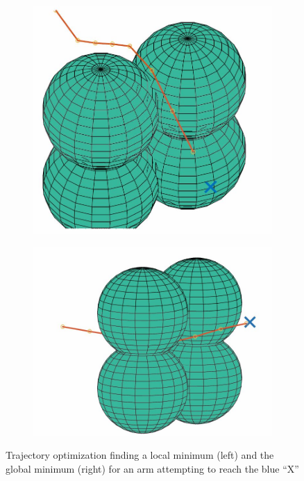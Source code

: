 \documentclass[../thesis.tex]{subfiles}
\begin{document}
\begin{figure}
  \centering
  \begin{subfigure}[b]{0.4\linewidth}
    \includegraphics[width=\linewidth]{./Planning/Local.jpg}    
  \end{subfigure}
  \begin{subfigure}[b]{0.4\linewidth}
    \includegraphics[width=\linewidth]{./Planning/global.jpg}    
  \end{subfigure}
  \caption{Trajectory optimization finding a local minimum (left) and the global minimum (right) for an arm attempting to reach the blue ``X''}
  \label{fig:local_min}
\end{figure}
\end{document}

